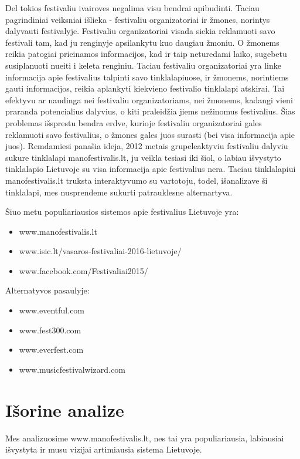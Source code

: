 ﻿\documentclass{VUMIFPSkursinis}
\begin{document}
{Del tokios festivaliu ivairoves negalima visu bendrai apibudinti. Taciau pagrindiniai veiksniai išlieka - festivaliu organizatoriai ir žmones, norintys dalyvauti festivalyje. 
Festivaliu organizatoriai visada siekia reklamuoti savo festivali tam, kad ju renginyje apsilankytu kuo daugiau žmoniu. 
O žmonems reikia patogiai prieinamos informacijos, kad ir taip neturedami laiko, sugebetu susiplanuoti nueiti i keleta renginiu. 
Taciau festivaliu organizatoriai yra linke informacija apie festivalius talpinti savo tinklalapiuose, ir žmonems, norintiems gauti informacijos, reikia aplankyti kiekvieno festivalio tinklalapi atskirai. 
Tai efektyvu ar naudinga nei festivaliu organizatoriams, nei žmonems, kadangi vieni praranda potencialius dalyvius, o kiti praleidžia jiems nežinomus festivalius. 
Šias problemas išsprestu bendra erdve, kurioje festivaliu organizatoriai gales reklamuoti savo festivalius, o žmones gales juos surasti (bei visa informacija apie juos). 
Remdamiesi panašia ideja, 2012 metais grupeleaktyviu festivaliu dalyviu sukure tinklalapi manofestivalis.lt, ju veikla tesiasi iki šiol, o labiau išvystyto tinklalapio Lietuvoje su visa informacija apie festivalius nera. 
Taciau tinklalapiui manofestivalis.lt truksta interaktyvumo su vartotoju, todel, išanalizave ši tinklalapi, mes nusprendeme sukurti patrauklesne alternartyva. 

\vspace{5mm} 

\noindent
Šiuo metu populiariausios sistemos apie festivalius Lietuvoje yra:

\begin{itemize}
\item www.manofestivalis.lt
\item www.isic.lt/vasaros-festivaliai-2016-lietuvoje/
\item www.facebook.com/Festivaliai2015/
\end{itemize}

\noindent
Alternatyvos pasaulyje:

\begin{itemize}
\item www.eventful.com
\item www.fest300.com
\item www.everfest.com
\item www.musicfestivalwizard.com
\end{itemize}

\section{Išorine analize}
Mes analizuosime www.manofestivalis.lt, nes tai yra populiariausia, labiausiai išvystyta ir musu vizijai artimiausia sistema Lietuvoje.
}
\end{document}
